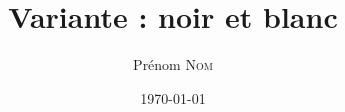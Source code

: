 \documentclass[11pt]{ocots-book}
\title{Variante : noir et blanc}
\author{Prénom \textsc{Nom}}
\date{\today}
\begin{document}
\ocotscollectsolutions

\ocotsprintsolutions
\end{document}
